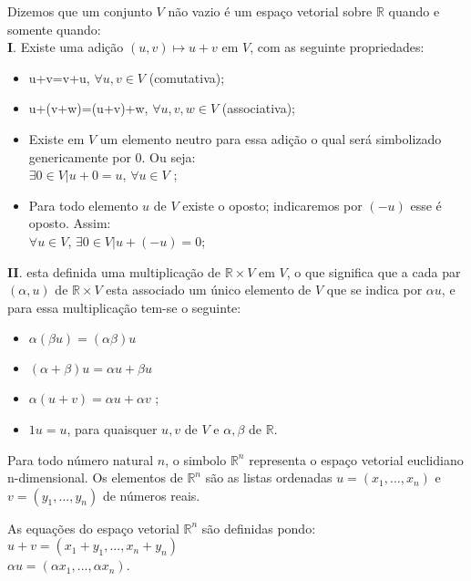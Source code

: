 \begin{df}
	Dizemos que um conjunto $V$ não vazio é um espaço vetorial sobre $ \mathbb{R}$ quando e somente quando:\\
	\textbf{I}. Existe uma adição $(u,v)\mapsto u+v$ em $V$, com as seguinte propriedades:
	\begin{itemize}
		\item u+v=v+u, $\forall u, v \in V$ (comutativa);
		\item u+(v+w)=(u+v)+w,  $\forall u, v, w \in V$ (associativa);
		\item Existe em $V$ um elemento neutro para essa adição o qual será simbolizado genericamente por $0$. Ou seja:\\
		$\exists 0\in V | u+0=u$, $\forall u \in V$ ;
		\item Para todo elemento $u$ de $V$ existe o oposto; indicaremos por $(-u)$ esse é oposto. Assim:\\
		$\forall u \in V$, $\exists 0\in V | u+(-u)=0$;
		
	\end{itemize}
	\textbf{II}. esta definida uma multiplicação de $\mathbb{R}\times V$ em $V$, o que significa que a cada par $(\alpha, u)$ de $\mathbb{R}\times V$ esta associado um único elemento de $V$ que se indica por $\alpha u$, e para essa multiplicação tem-se o seguinte:
	\begin{itemize}
		\item $\alpha(\beta u)=(\alpha\beta) u$ 
		\item $(\alpha+\beta)u=\alpha u +\beta u$
		\item $\alpha(u+v)=\alpha u+ \alpha v$ ;
		\item $1u=u$, para quaisquer $u, v$ de $V$ e $\alpha, \beta$ de $\mathbb{R}$.
		
	\end{itemize}
\end{df}
                                                       

\begin{ex}
Para todo número natural $n$, o simbolo $\mathbb{R}^{n}$ representa o espaço vetorial euclidiano n-dimensional. Os elementos de $\mathbb{R}^{n}$ são as listas ordenadas $u=\left( x_{1},...,x_{n}\right)$ e $v=\left(y_{1},...,y_{n} \right)$ de números reais.	
\end{ex}
As equações do espaço vetorial $\mathbb{R}^{n}$ são definidas pondo:\\
$u+v=\left(x_{1}+y_{1},...,x_{n}+y_{n}\right)$\\
$\alpha u=\left(\alpha x_{1},...,\alpha x_{n}\right)$.

